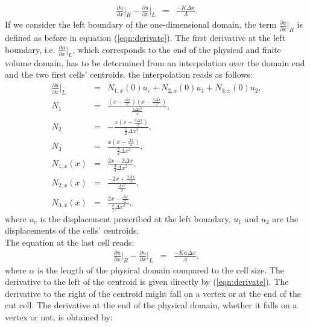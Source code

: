 \documentclass[a4paper,12pt]{article}
\begin{document}
\begin{eqnarray}
\frac{\partial u}{\partial x}\vert_{R} -\frac{\partial u}{\partial x}\vert_{L} &=&\frac{-K\Delta x}{A}.
\end{eqnarray}
If we consider the left boundary of the one-dimensional domain, the term $\frac{\partial u}{\partial x}\vert_{R}$ is defined as before in equation (\ref{eqn:derivate}). The first derivative at the left boundary, i.e. $\frac{\partial u}{\partial x}\vert_{L}$, which corresponds to the end of the physical and finite volume domain, has to be determined from an interpolation over the domain end and the two first cells' centroids. the interpolation reads as follows:
\begin{eqnarray}
\frac{\partial u}{ \partial x}\vert_{L} &=& N_{1,x}(0)u_e + N_{2,x}(0)u_1 + N_{3,x}(0)u_2,\\
N_1 &=& \frac{(x-\frac{\Delta x}{2})(x - \frac{3 \Delta x}{2})}{\frac{3\Delta x^2}{4}},\\
N_2 &=& - \frac{x(x- \frac{3\Delta x}{2})}{\frac{1}{2}\Delta x^2},\\
N_3 &=& \frac{x(x-\frac{\Delta x}{2})}{\frac{3}{2}\Delta x^2},\\
N_{1,x}(x) &=& \frac{2x - 2\Delta x}{\frac{3}{4}\Delta x^2},\\
N_{2,x}(x) &=& \frac{-2x + \frac{3\Delta x}{2}}{\frac{\Delta x^2}{2}},\\
N_{3,x}(x) &=& \frac{2x - \frac{\Delta x}{2}}{\frac{3}{2}\Delta x^2},
\end{eqnarray}
where $u_e$ is the displacement prescribed at the left boundary, $u_1$ and $u_2$ are the displacements of the  cells' centroids.\\
The equation at the last cell reads:
\begin{eqnarray}
\frac{\partial u}{\partial x}\vert_{R} -\frac{\partial u}{\partial x}\vert_{L} &=&\frac{-K\alpha\Delta x}{A},
\end{eqnarray}
where $\alpha$ is the length of the physical domain compared to the cell size. The derivative to the left of the centroid is given directly by (\ref{eqn:derivate}). The derivative to the right of the centroid might fall on a vertex or at the end of the cut cell. 
The derivative at the end of the physical domain, whether it falls on a vertex or not, is obtained by:
\end{document}

